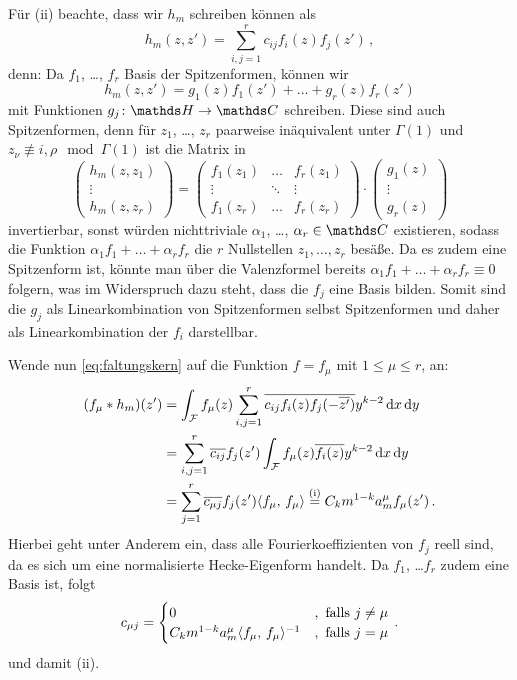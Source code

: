 \begin{bewe}
	Für (ii) beachte, dass wir $h_m$ schreiben können als
	\[
	h_m(z,z') = \sum_{i,j=1}^r c_{ij}f_i(z)f_j(z')
	\,,
	\]
	denn: Da $f_1$, \ldots, $f_r$ Basis der Spitzenformen, können wir 
	\[
	h_m(z, z') = g_1(z) f_1(z') + \ldots + g_r(z) f_r(z')
	\]
	mit Funktionen $g_j \colon \HH \ra \CC$ schreiben. 
	Diese sind auch Spitzenformen, denn für $z_1$, \ldots, $z_r$ paarweise inäquivalent unter $\Gamma(1)$ und $z_\nu \not\equiv i, \rho \mod \Gamma(1)$ ist die Matrix in
	\[
	\begin{pmatrix}
	h_m(z,z_1) \\
	\vdots \\
	h_m(z,z_r)
	\end{pmatrix}
	= \begin{pmatrix}
	f_1(z_1) & \ldots & f_r(z_1) \\
	\vdots & \ddots & \vdots \\
	f_1(z_r) & \ldots & f_r(z_r)
	\end{pmatrix}
	\cdot 
	\begin{pmatrix}
	g_1(z) \\
	\vdots \\
	g_r(z)
	\end{pmatrix}
	\]
	invertierbar, sonst würden nichttriviale $\alpha_1$, \ldots, $\alpha_r \in \CC$ existieren, sodass die Funktion $\alpha_1 f_1 + \ldots + \alpha_r f_r$ die $r$ Nullstellen $z_1, \ldots, z_r$ besäße. Da es zudem eine Spitzenform ist, könnte man über die Valenzformel bereits $\alpha_1 f_1 + \ldots + \alpha_r f_r \equiv 0$ folgern, was im Widerspruch dazu steht, dass die $f_j$ eine Basis bilden.
	Somit sind die $g_j$ als Linearkombination von Spitzenformen selbst Spitzenformen und daher als Linearkombination der $f_i$ darstellbar.
	
	Wende nun \eqref{eq:faltungskern} auf die Funktion $f = f_\mu$ mit $1 \leq \mu \leq r$, an:
	\[
	\begin{split}
	(f_\mu * h_m)(z')
	&= \int_\F f_\mu(z) \sum_{i,j=1}^r \conj{c_{ij} f_i(z) f_j(-\conj{z'})} y^{k-2} \opd x \opd y \\
	&= \sum_{i,j=1}^r \conj{c_{ij}} f_j(z') \int_\F f_\mu(z) \conj{f_i(z)} y^{k-2} \opd x \opd y \\
	&= \sum_{j=1}^r \conj{c_{\mu j}} f_j(z') \scalarprd{f_\mu}{f_\mu}
	\stackrel{\text{(i)}}{=} C_km^{1-k} a_m^\mu f_\mu(z')
	\,.
	\end{split}
	\]
	Hierbei geht unter Anderem ein, dass alle Fourierkoeffizienten von $f_j$ reell sind, da es sich um eine normalisierte Hecke-Eigenform handelt.
	Da $f_1$, \ldots $f_r$ zudem eine Basis ist, folgt
	\[
	c_{\mu j} =
	\begin{cases}
	0 & , \text{ falls } j \not= \mu \\
	C_k m^{1-k} a_m^\mu \scalarprd{f_\mu}{f_\mu}^{-1} & , \text{ falls } j = \mu
	\end{cases}
	\,.
	\]
	und damit (ii).
	

\end{bewe}
